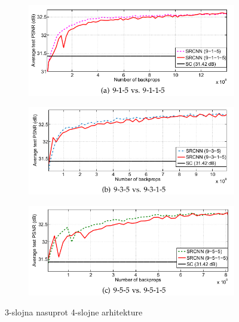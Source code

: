 \documentclass[12pt]{report}
\numberwithin{equation}{section}
\begin{document}
 
\begin{figure}[h]
\begin{subfigure}{0.5\textwidth}
  \centering
  \includegraphics[width=1\linewidth]{SLIKE/figure8a}
  \label{fig:8sfig1}
\end{subfigure}
\vspace{-20pt}
\begin{subfigure}{0.5\textwidth}
  \centering
  \includegraphics[width=1\linewidth]{SLIKE/figure8b}
  \label{fig:8sfig2}
\end{subfigure}
\begin{subfigure}{0.5\textwidth}
  \centering
  \includegraphics[width=1\linewidth]{SLIKE/figure8c}
  \label{fig:8sfig3}
\end{subfigure}
\caption{3-slojna nasuprot 4-slojne arhitekture}
\label{fig:ogled8}
\end{figure}
\end{document}
